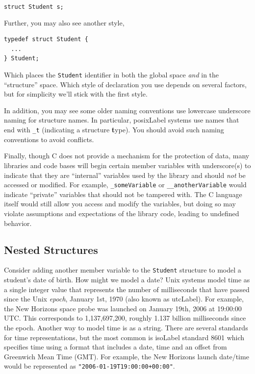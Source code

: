 \texttt{struct Student s;}

Further, you may also see another style, 

\begin{verbatim}
typedef struct Student {
  ...
} Student;
\end{verbatim}

Which places the \texttt{Student} identifier in both
the global space \emph{and} in the ``structure'' space.  
Which style of declaration you use depends on several factors, 
but for simplicity we'll stick with the first style.


In addition, you may see some older naming conventions use lowercase 
underscore naming for structure names.  In particular, \gls{posixLabel}
systems use names that end with \texttt{_t} (indicating
a structure \textbf{t}ype).  You should avoid such naming
conventions to avoid conflicts.

Finally, though C does not provide a mechanism for the protection of
data, many libraries and code bases will begin certain member variables
with underscore(s) to indicate that they are ``internal'' variables
used by the library and should \emph{not} be accessed or modified.
For example, \texttt{_someVariable} or \texttt{__anotherVariable} would indicate ``private'' variables that should
not be tampered with.  The C language itself would still allow you 
access and modify the variables, but doing so may violate assumptions
and expectations of the library code, leading to undefined behavior.

\subsection{Nested Structures}

Consider adding another member variable to the \texttt{Student}
structure to model a student's date of birth.  How might we model
a date?  Unix systems model time as a single integer value that
represents the number of milliseconds that have passed since the
Unix \emph{epoch}, January 1st, 1970 (also known as \gls{utcLabel}).  
For example, the New Horizons space probe
was launched on January 19th, 2006 at 19:00:00 UTC.  This corresponds
to 1,137,697,200, roughly 1.137 billion milliseconds since the
epoch.  Another way to model time is as a string.  There are several
standards for time representations, but the most common is \gls{isoLabel}
standard 8601 \cite{ISO:1988:IDE} which specifies time using a format that
includes a date, time and an offset from Greenwich Mean Time (GMT).
For example, the New Horizons launch date/time would be represented
as \texttt{"2006-01-19T19:00:00+00:00"}.

